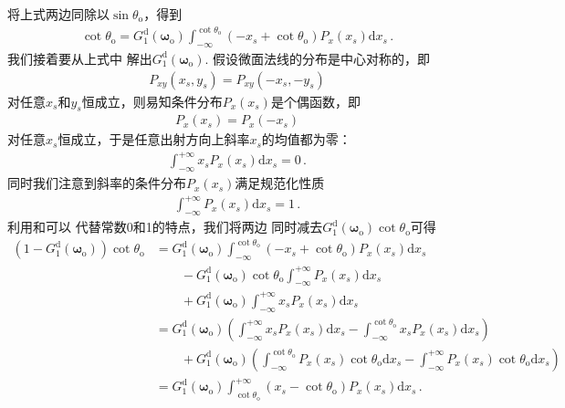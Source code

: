 将上式两边同除以$\sin\theta_{\mathrm{o}}$，得到
\begin{align}\label{eq:08-ex01-cot-theta0-g1-distant}
    \cot\theta_{\mathrm{o}}=G_1^{\mathrm{d}}({\bm\omega}_{\mathrm{o}})
    \int_{-\infty}^{\cot\theta_{\mathrm{o}}}
    (-x_s+\cot\theta_{\mathrm{o}})P_x(x_s)\mathrm{d}x_s\, .
\end{align}
我们接着要从上式中
解出$G_1^{\mathrm{d}}({\bm\omega}_{\mathrm{o}})$.
假设微面法线的分布是中心对称的，即
\begin{align}
    P_{xy}(x_s,y_s)=P_{xy}(-x_s,-y_s)
\end{align}
对任意$x_s$和$y_s$恒成立，则易知条件分布$P_{x}(x_s)$是个偶函数，即
\begin{align}
    P_{x}(x_s)=P_{x}(-x_s)
\end{align}
对任意$x_s$恒成立，于是任意出射方向上斜率$x_s$的均值都为零：
\begin{align}\label{eq:08-ex01-mean-slope-conditional}
    \int_{-\infty}^{+\infty}x_sP_{x}(x_s)\mathrm{d}x_s=0\, .
\end{align}
同时我们注意到斜率的条件分布$P_x(x_s)$满足规范化性质
\begin{align}\label{eq:08-ex01-normal-slope-int}
    \int_{-\infty}^{+\infty}P_{x}(x_s)\mathrm{d}x_s=1\, .
\end{align}
利用和可以
代替常数0和1的特点，我们将两边
同时减去$G_1^{\mathrm{d}}({\bm\omega}_{\mathrm{o}})\cot\theta_{\mathrm{o}}$可得
\begin{align}
    (1-G_1^{\mathrm{d}}({\bm\omega}_{\mathrm{o}}))\cot\theta_{\mathrm{o}}
     & =G_1^{\mathrm{d}}({\bm\omega}_{\mathrm{o}})
    \int_{-\infty}^{\cot\theta_{\mathrm{o}}}
    (-x_s+\cot\theta_{\mathrm{o}})P_x(x_s)\mathrm{d}x_s\nonumber                          \\
     & \qquad -G_1^{\mathrm{d}}({\bm\omega}_{\mathrm{o}})\cot\theta_{\mathrm{o}}
    \int_{-\infty}^{+\infty}P_{x}(x_s)\mathrm{d}x_s\nonumber                              \\
     & \qquad +G_1^{\mathrm{d}}({\bm\omega}_{\mathrm{o}})
    \int_{-\infty}^{+\infty}x_sP_{x}(x_s)\mathrm{d}x_s\nonumber                           \\
     & \displaystyle =G_1^{\mathrm{d}}({\bm\omega}_{\mathrm{o}})
    \left(\int_{-\infty}^{+\infty}x_sP_{x}(x_s)\mathrm{d}x_s
    -\int_{-\infty}^{\cot\theta_{\mathrm{o}}}x_sP_{x}(x_s)\mathrm{d}x_s\right)\nonumber   \\
     & \qquad\displaystyle +G_1^{\mathrm{d}}({\bm\omega}_{\mathrm{o}})
    \left(\int_{-\infty}^{\cot\theta_{\mathrm{o}}}P_x(x_s)\cot\theta_{\mathrm{o}}\mathrm{d}x_s
    -\int_{-\infty}^{+\infty}P_x(x_s)\cot\theta_{\mathrm{o}}\mathrm{d}x_s\right)\nonumber \\
     & =G_1^{\mathrm{d}}({\bm\omega}_{\mathrm{o}})
    \int_{\cot\theta_{\mathrm{o}}}^{+\infty}(x_s-\cot\theta_{\mathrm{o}})P_x(x_s)\mathrm{d}x_s\, .
\end{align}
